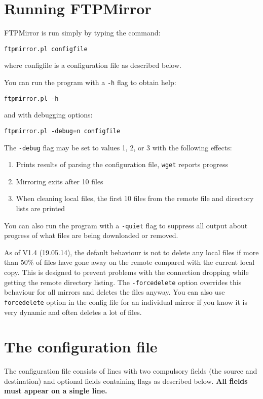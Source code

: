 \documentclass{article}
\begin{document}
\section{Running FTPMirror}
FTPMirror is run simply by typing the command:
\begin{verbatim}
ftpmirror.pl configfile
\end{verbatim}
where configfile is a configuration file as described below.
\vspace{2em}

You can run the program with a \verb|-h| flag to obtain help:
\begin{verbatim}
ftpmirror.pl -h
\end{verbatim}
and with debugging options:
\begin{verbatim}
ftpmirror.pl -debug=n configfile
\end{verbatim}
The \verb|-debug| flag may be set to values 1, 2, or 3 with the
following effects:
\begin{enumerate}
\item Prints results of parsing the configuration file, \verb|wget| reports
  progress 
\item Mirroring exits after 10 files
\item When cleaning local files, the first 10 files from the remote
  file and directory lists are printed
\end{enumerate}
\vspace{2em}

You can also run the program with a \verb|-quiet| flag to suppress all
output about progress of what files are being downloaded or removed.

As of V1.4 (19.05.14), the default behaviour is not to delete any
local files if more than 50\% of files have gone away on the remote
compared with the current local copy. This is designed to prevent
problems with the connection dropping while getting the remote
directory listing. The \verb|-forcedelete| option overrides this behaviour 
for all mirrors and deletes the files anyway. You can also use
\verb|forcedelete| option in the config file for an individual mirror
if you know it is very dynamic and often deletes a lot of files.


\section{The configuration file}
The configuration file consists of lines with two compulsory fields
(the source and destination) and optional fields containing flags as
described below. {\bfseries All fields must appear on a single line.}
\end{document}
